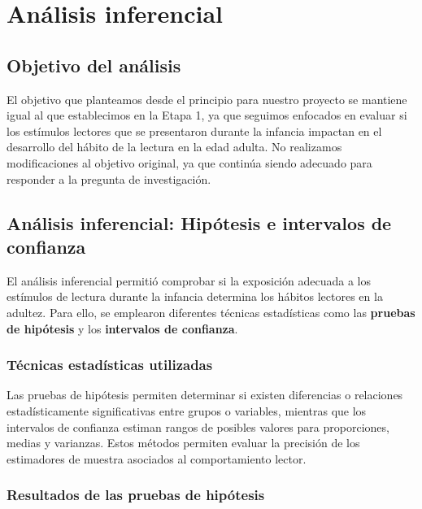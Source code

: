 \documentclass[aps,reprint]{revtex4-2}
\begin{document}
\section{Análisis inferencial}
\subsection{Objetivo del análisis}

El objetivo que planteamos desde el principio para nuestro proyecto se mantiene igual al que establecimos en la Etapa 1, ya que seguimos enfocados en evaluar si los estímulos lectores que se presentaron durante la infancia impactan en el desarrollo del hábito de la lectura en la edad adulta. No realizamos modificaciones al objetivo original, ya que continúa siendo adecuado para responder a la pregunta de investigación.

\subsection{Análisis inferencial: Hipótesis e intervalos de confianza}

El análisis inferencial permitió comprobar si la exposición adecuada a los estímulos de lectura durante la infancia determina los hábitos lectores en la adultez. Para ello, se emplearon diferentes técnicas estadísticas como las \textbf{pruebas de hipótesis} y los \textbf{intervalos de confianza}.

\subsubsection*{Técnicas estadísticas utilizadas}
Las pruebas de hipótesis permiten determinar si existen diferencias o relaciones estadísticamente significativas entre grupos o variables, mientras que los intervalos de confianza estiman rangos de posibles valores para proporciones, medias y varianzas. Estos métodos permiten evaluar la precisión de los estimadores de muestra asociados al comportamiento lector.

\subsubsection*{Resultados de las pruebas de hipótesis}
\end{document}
